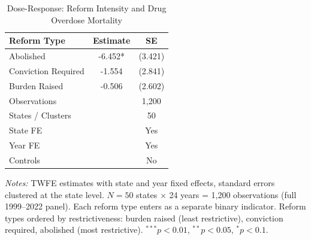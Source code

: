 \begin{table}[H]
\centering
\caption{Dose-Response: Reform Intensity and Drug Overdose Mortality}
\label{tab:dose}
\begin{tabular}{lcc}
\toprule
Reform Type & Estimate & SE \\
\midrule
Abolished & -6.452* & (3.421) \\
Conviction Required & -1.554 & (2.841) \\
Burden Raised & -0.506 & (2.602) \\
\midrule
\multicolumn{2}{l}{Observations} & 1,200 \\
\multicolumn{2}{l}{States / Clusters} & 50 \\
\multicolumn{2}{l}{State FE} & Yes \\
\multicolumn{2}{l}{Year FE} & Yes \\
\multicolumn{2}{l}{Controls} & No \\
\bottomrule
\end{tabular}
\begin{tablenotes}[flushleft]
\small
\item \textit{Notes:} TWFE estimates with state and year fixed effects, standard errors clustered at the state level. $N = 50$ states $\times$ 24 years = 1,200 observations (full 1999--2022 panel). Each reform type enters as a separate binary indicator. Reform types ordered by restrictiveness: burden raised (least restrictive), conviction required, abolished (most restrictive). $^{***}p<0.01$, $^{**}p<0.05$, $^{*}p<0.1$.
\end{tablenotes}
\end{table}
